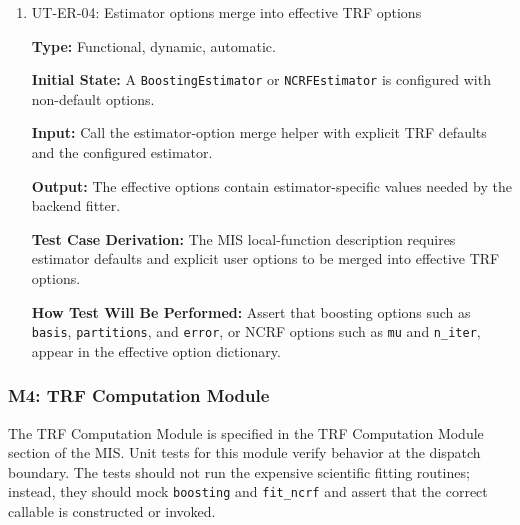 \documentclass[12pt, titlepage]{article}
\begin{document}
\begin{enumerate}
\textbf{Input:} \texttt{\_resolve\_estimator(object())}.

\textbf{Output:} \texttt{ValueError} is raised because the input is neither \texttt{str}, \texttt{Estimator}, nor \texttt{None}.

\textbf{Test Case Derivation:} The MIS specifies that invalid estimator types are rejected.

\textbf{How Test Will Be Performed:} Pass a plain object and assert \texttt{ValueError}.

\item{UT-ER-04: Estimator options merge into effective TRF options\\}

\textbf{Type:} Functional, dynamic, automatic.

\textbf{Initial State:} A \texttt{BoostingEstimator} or \texttt{NCRFEstimator} is configured with non-default options.

\textbf{Input:} Call the estimator-option merge helper with explicit TRF defaults and the configured estimator.

\textbf{Output:} The effective options contain estimator-specific values needed by the backend fitter.

\textbf{Test Case Derivation:} The MIS local-function description requires estimator defaults and explicit user options to be merged into effective TRF options.

\textbf{How Test Will Be Performed:} Assert that boosting options such as \texttt{basis}, \texttt{partitions}, and \texttt{error}, or NCRF options such as \texttt{mu} and \texttt{n\_iter}, appear in the effective option dictionary.

\end{enumerate}

\subsubsection{M4: TRF Computation Module}

The TRF Computation Module is specified in the TRF Computation Module section of the MIS. Unit tests for this module verify behavior at the dispatch boundary. The tests should not run the expensive scientific fitting routines; instead, they should mock \texttt{boosting} and \texttt{fit\_ncrf} and assert that the correct callable is constructed or invoked.
\end{document}

